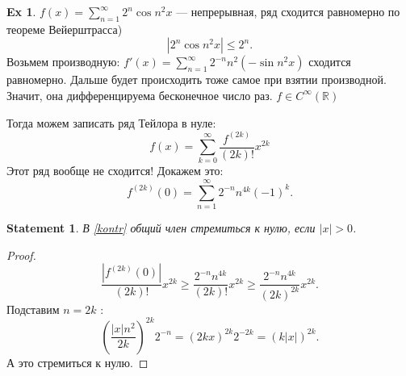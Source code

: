\documentclass[11pt]{book}
\newcommand{\R}{\mathbb{R}}
\renewcommand{\le}{\leqslant}
\renewcommand{\ge}{\geqslant}
\theoremstyle{definition}
\theoremstyle{plain}
\theoremstyle{plain}
\newtheorem*{st}{Statement}
\theoremstyle{definition}
\newtheorem*{ex}{Ex}
\theoremstyle{remark}
\begin{document}
\begin{ex}
    $ f(x) = \sum_{n=1}^{\infty} 2^{n} \cos n^2 x $ --- непрерывная, ряд сходится равномерно по теореме Вейерштрасса)
    \[
	|2^{n} \cos n^2x | \le  2 ^{ n}
    .\]
    Возьмем производную:
    $
    f'(x) = \sum_{n=1}^{\infty} 2^{-n} n^2 (- \sin n ^2 x)
    $   сходится равномерно.
    Дальше будет происходить тоже самое при взятии производной. Значит, она дифференцируема бесконечное число раз. $ f \in  C^{\infty} (\R)$

    Тогда можем записать ряд Тейлора в нуле:
    \begin{equation}\label{kontr}
	f(x) =  \sum_{k=0}^{\infty} \frac{f^{(2k)}}{(2k)!} x^{2k}
    \end{equation}
    Этот ряд вообще не сходится! Докажем это:
    \[
	f^{(2k)} (0) = \sum_{n=1}^{\infty} 2 ^{-n} n^{4k} (-1)^{k}
    .\]
    \begin{st}
	В \ref{kontr} общий член стремиться к нулю, если $ |x| > 0$.
    \end{st}
    \begin{proof}
	\[
	    \frac{|f^{(2k)} (0)|}{(2k)!} x^{2k} \ge \frac{2^{-n} n^{4k}}{(2k)!} x ^{ 2k} \ge \frac{2^{-n} n^{4k}}{(2k)^{2k}} x ^{ 2k}
	.\]
	Подставим $ n = 2k$ :
	\[
	    \left( \frac{|x| n^2}{2k} \right) ^{2k} 2^{-n} = (2kx)^{2k} 2 ^{-2k} = (k |x|)^{ 2k}
	.\]
	А это стремиться к нулю.
    \end{proof}
\end{ex}
\end{document}
